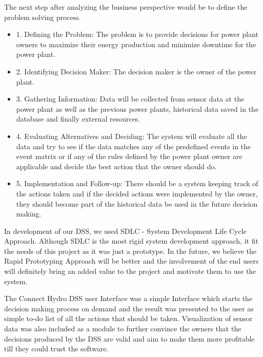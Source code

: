 The next step after analyzing the business perspective would be to define the problem solving process.
\begin{itemize}
	\item 1. Defining the Problem: The problem is to provide decisions for power plant owners to maximize their energy production and minimize downtime for the power plant.
	\item 2. Identifying Decision Maker: The decision maker is the owner of the power plant.
	\item 3. Gathering Information: Data will be collected from sensor data at the power plant as well as the previous power plants, historical data saved in the database and finally external resources.
	\item 4. Evaluating Alternatives and Deciding: The system will evaluate all the data and try to see if the data matches any of the predefined events in the event matrix or if any of the rules defined by the power plant owner are applicable and decide the best action that the owner should do.
	\item 5. Implementation and Follow-up: There should be a system keeping track of the actions taken and if the decided actions were implemented by the owner, they should become part of the historical data be used in the future decision making.
\end{itemize}
In development of our DSS, we used SDLC - System Development Life Cycle Approach. Although SDLC is the most rigid system development approach, it fit the needs of this project as it was just a prototype. In the future, we believe the Rapid Prototyping Approach will be better and the involvement of the end users will definitely bring an added value to the project and motivate them to use the system.

The Connect Hydro DSS user Interface was a simple Interface which starts the decision making process on demand and the result was presented to the user as simple to-do list of all the actions that should be taken. Visualization of sensor data was also included as a module to further convince the owners that the decisions produced by the DSS are valid and aim to make them more profitable till they could trust the software.
